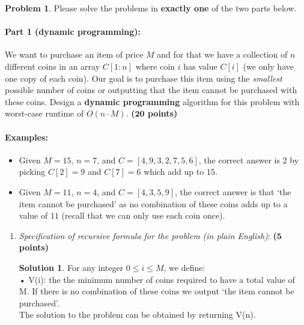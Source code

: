 \documentclass{article}
\theoremstyle{definition}
\newtheorem{problem}{Problem}
\newtheorem*{solution*}{Solution}
\newenvironment{solution}{\begin{solution*}}{{} \end{solution*}}
\newcommand{\grade}[1]{\hfill{\textbf{($\mathbf{#1}$ points)}}}
\begin{document}
\newpage
\begin{problem}\label{DP-greedy}
Please solve the problems in \textbf{exactly one} of the two parts below. 

\paragraph{Part 1 (dynamic programming):} We want to purchase an item of price $M$ and for that we have a collection of $n$ different coins in an array $C[1:n]$ where coin $i$ has value $C[i]$ (we only have one copy of each coin).  
	Our goal is to purchase this item using the \emph{smallest} possible number of coins or outputting that the item cannot be purchased with these coins. 
	Design a \textbf{dynamic programming} algorithm for this problem with worst-case runtime of $O(n \cdot M)$. \grade{20}
	
	\paragraph{Examples:}
	\begin{itemize}
		\item Given $M=15$, $n=7$, and $C = [4,9,3,2,7,5,6]$, the correct answer is $2$ by picking $C[2]=9$ and $C[7]=6$ which add up to $15$. 
		\item Given $M=11$, $n=4$, and $C = [4,3,5,9]$, the correct answer is that `the item cannot be purchased' as no combination of these coins adds up to a value of $11$ (recall that we can only use each coin once). 
	\end{itemize}
	
	\begin{enumerate}[label=(\alph*)]
	\item \emph{Specification of recursive formula for the problem (in plain English)}: \grade{5}
	
	\bigskip	
	\begin{solution}
	
	For any integer $0\leq i \leq M$, we define: \\

	• V(i): the the minimum number of coins required to have a total value of M. If there is no combination of these coins we output ‘the item cannot be purchased’. \\
	
	The solution to the problem can be obtained by returning V(n). \\
	
	\end{solution}
	

\end{enumerate}
\end{problem}
\end{document}
